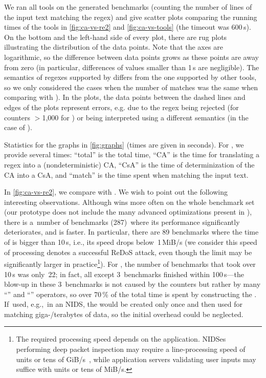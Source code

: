 \documentclass[acmsmall,screen]{acmart}
\begin{document}
%
We ran all tools on the generated benchmarks (counting the number of lines of
the input text matching the regex) and give scatter plots comparing the running
times of the tools in \cref{fig:ca-vs-re2} and \cref{fig:ca-vs-tools} (the
timeout was 600\,s).
On the bottom and the left-hand side of every plot, there are rug plots
illustrating the distribution of the data points.
Note that the axes are logarithmic, so the difference between data points grows
as these points are away from zero (in particular, differences of values
smaller than 1\,s are negligible).
The semantics of regexes supported by \grep differs from the one
supported by other tools, so we only considered the
cases when the number of matches was the same when comparing with \grep).
In the plots, the data points between the dashed lines and edges of the plots
represent errors, e.g. due to the regex being rejected (for counters $>$1,000 for
\retwo) or being interpreted using a different semantics (in the case of \grep).

\begin{table}[t]
\footnotesize
\caption{Statistics for the graphs in \cref{fig:graphs} (times are given in seconds).
For \catool, we provide several times:
``total'' is the total time,
``CA'' is the time for translating a regex into a (nondeterministic) CA,
``CsA'' is the time of determinization of the CA into a CsA, and
``match'' is the time spent when matching the input text.
}
\vspace*{-2.5mm}
\begin{center}

\end{center}
\label{tab:stats}
\vspace{-2.0mm}
\end{table}

In \cref{fig:ca-vs-re2}, we compare \catool with \retwo.
We wish to point out the following interesting observations.
Although \retwo wins more often  on the whole benchmark set 
(our prototype does not include the many
advanced optimizations present in \retwo),
there is
a~number of benchmarks (287)\ where its performance significantly deteriorates,
and \catool is faster.
In particular, there are 89 benchmarks where the time of \retwo is bigger than
10\,s, i.e., its speed drops below~1\,MiB/s (we consider this speed of
processing denotes a successful ReDoS attack, even though the limit may be
significantly larger in practice\footnote{%
  The required processing speed depends on the application.
  NIDSes performing deep packet inspection may require a line-processing speed of
  units or tens of GiB/s~\cite{tacas18-appred}, while application servers
  validating user inputs may suffice with units or tens of MiB/s.
}).
For \catool, the number of benchmarks that took over 10\,s was only~22; 
in fact, all except
3~benchmarks finished within 100\,s---the blow-up in these 3~benchmarks is not caused by the
counters but rather by many ``\regex{|}'' and ``'' operators, so over
70\,\% of the total time is spent by constructing the \CSA.
If~used, e.g.,\ in an NIDS, the \CSA would be created only once and then used
for matching giga-/terabytes of data, so the initial overhead could be neglected.
\end{document}
